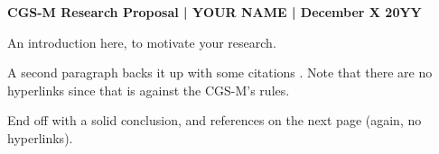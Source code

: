 \documentclass[12pt]{article} %
\begin{document}
\begin{center}
	{\large\textbf{CGS-M Research Proposal | YOUR NAME | December X 20YY}}
\end{center}

\begin{comment}
Plan out your paragraph in a comment
\end{comment}
An introduction here, to motivate your research.

A second paragraph backs it up with some citations \cite{leshuk_petroleomic_2018}.
Note that there are no hyperlinks since that is against the CGS-M's rules.

End off with a solid conclusion, and references on the next page (again, no hyperlinks).

\newpage
\printbibliography
\end{document}
